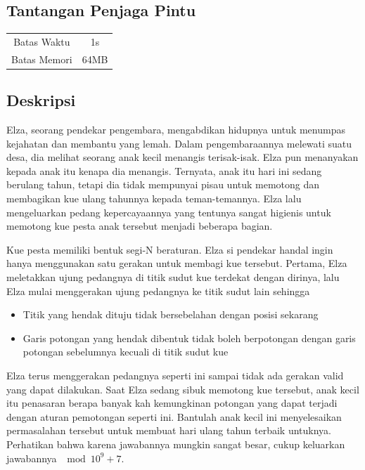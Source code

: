 \documentclass{article}
\begin{document}
\begin{center}
    \section*{Tantangan Penjaga Pintu} %

    \begin{tabular}{ | c c | }
        \hline
        Batas Waktu  & 1s \\    %
        Batas Memori & 64MB \\  %
        \hline
    \end{tabular}
\end{center}

\subsection*{Deskripsi}

Elza, seorang pendekar pengembara, mengabdikan hidupnya untuk menumpas kejahatan dan membantu yang lemah. Dalam pengembaraannya melewati suatu desa, dia melihat seorang anak kecil menangis terisak-isak. Elza pun menanyakan kepada anak itu kenapa dia menangis. Ternyata, anak itu hari ini sedang berulang tahun, tetapi dia tidak mempunyai pisau untuk memotong dan membagikan kue ulang tahunnya kepada teman-temannya. Elza lalu mengeluarkan pedang kepercayaannya yang tentunya sangat higienis untuk memotong kue pesta anak tersebut menjadi beberapa bagian.

Kue pesta memiliki bentuk segi-N beraturan. Elza si pendekar handal ingin hanya menggunakan satu gerakan untuk membagi kue tersebut. Pertama, Elza meletakkan ujung pedangnya di titik sudut kue terdekat dengan dirinya, lalu Elza mulai menggerakan ujung pedangnya ke titik sudut lain sehingga

\begin{itemize}
    \setlength\itemsep{0pt}
    \item Titik yang hendak dituju tidak bersebelahan dengan posisi sekarang
    \item Garis potongan yang hendak dibentuk tidak boleh berpotongan dengan garis potongan sebelumnya kecuali di titik sudut kue
\end{itemize}

Elza terus menggerakan pedangnya seperti ini sampai tidak ada gerakan valid yang dapat dilakukan. Saat Elza sedang sibuk memotong kue tersebut, anak kecil itu penasaran berapa banyak kah kemungkinan potongan yang dapat terjadi dengan aturan pemotongan seperti ini. Bantulah anak kecil ini menyelesaikan permasalahan tersebut untuk membuat hari ulang tahun terbaik untuknya. Perhatikan bahwa karena jawabannya mungkin sangat besar, cukup keluarkan jawabannya $\mod 10^9 + 7$.
\end{document}
